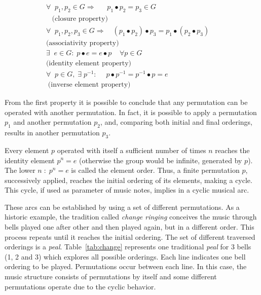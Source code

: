 \documentclass[
 aip,
 jmp,
 amsmath,amssymb,
 reprint,
]{revtex4-1}
\begin{document}
\begin{multline}\label{eq:groups}
\forall \;\; p_1,p_2 \in G \Rightarrow\quad\;\; p_1 \bullet p_2  =
p_3 \in G \\ \;\;\;\text{(closure property)} \\
\forall \;\; p_1,p_2,p_3 \in G \Rightarrow\quad (p_1\bullet p_2)\bullet p_3  =
p_1\bullet (p_2\bullet p_3)\quad\;  \\ \text{(associativity property)} \\
\exists \;\; e \in G :\; p \bullet e  = e \bullet
p \;\;\;\; \forall p \in G  \quad \\ \text{(identity element property)} \\
\forall \;\; p \in G, \;\exists\; p^{-1} :\quad\;  p\bullet p^{-1} 
=p^{-1}\bullet p = e \\ \; \text{(inverse element property)}
\end{multline}

From the first property it is possible to conclude that any permutation can be
operated with another permutation. In fact, it is possible to apply a
permutation $p_1$ and another permutation $p_2$, and, comparing both initial and final
orderings, results in another permutation $p_3$.

Every element $p$ operated with itself a sufficient number of times $n$ reaches
the identity element $p^n=e$ (otherwise the group would be infinite, generated
by $p$). The lower $n\;:\;p^n=e$ is called the element order. Thus, a finite
permutation $p$, successively applied, reaches the initial ordering of its
elements, making a cycle. This cycle, if used as parameter of music notes,
implies in a cyclic musical arc.

These arcs can be established by using a set of different permutations. As a historic
example, the tradition called \emph{change ringing} conceives the music through
bells played one after other and then played again, but in a different
order. This process repeats until it reaches the initial ordering. The set of
different traversed orderings is a \emph{peal}. Table~\ref{tab:change}
represents one traditional \emph{peal} for 3 bells (1, 2 and 3) which explores
all possible orderings. Each line indicates one bell ordering to be
played. Permutations occur between each line. In this case, the music structure
consists of permutations by itself and some different permutations operate due to
the cyclic behavior.
\end{document}
